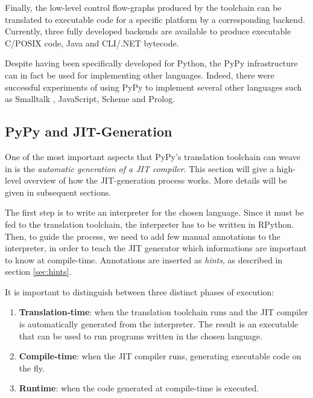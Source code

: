 Finally, the low-level control flow-graphs produced by the toolchain
can be translated to executable code for a specific platform by a
corresponding backend.
Currently, three fully developed backends are available to produce
executable C/POSIX code, Java and CLI/.NET bytecode. 

Despite having been specifically developed for Python, the PyPy infrastructure
can in fact be used for implementing other languages. Indeed, there were
successful experiments of using PyPy to implement several other languages such
as Smalltalk \cite{BolzEtAl08}, JavaScript, Scheme and Prolog.


\subsection{PyPy and JIT-Generation}

One of the most important aspects that PyPy's translation toolchain can weave
in is the \emph{automatic generation of a JIT compiler}.  This section will
give a high-level overview of how the JIT-generation process works. More
details will be given in subsequent sections.

The first step is to write an interpreter for the chosen language.  Since it
must be fed to the translation toolchain, the interpreter has to be written in
RPython.  Then, to guide the process, we need to add few manual
annotations to the interpreter, in order to teach the JIT generator which
informations are important to know at compile-time.  Annotations are inserted
as \emph{hints}, as described in section \ref{sec:hints}.

It is important to distinguish between three distinct phases of execution:

\begin{enumerate}
\item \textbf{Translation-time}: when the translation toolchain runs and the
  JIT compiler is automatically generated from the interpreter.  The result is
  an executable that can be used to run programs written in the chosen
  language.
\item \textbf{Compile-time}: when the JIT compiler runs, generating executable
  code on the fly.
\item \textbf{Runtime}: when the code generated at compile-time is executed.
\end{enumerate}

